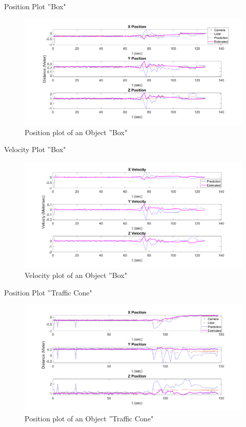 \documentclass[10pt]{beamer}
\begin{document}
\begin{frame}{Position Plot ''Box"}
\begin{figure}
    \centering
    \includegraphics[width=1\textwidth]{Images/Box_position.png}
    \caption{Position plot of an Object ''Box"}
\end{figure}
\end{frame}

\begin{frame}{Velocity Plot ''Box"}
\begin{figure}
    \centering
    \includegraphics[width=1\textwidth]{Images/Box_velocity.png}
    \caption{Velocity plot of an Object ''Box"}
\end{figure}
\end{frame}

\begin{frame}{Position Plot ''Traffic Cone"}
\begin{figure}
    \centering
    \includegraphics[width=1\textwidth]{Images/TC_position.png}
    \caption{Position plot of an Object ''Traffic Cone"}
\end{figure}
\end{frame}
\end{document}
